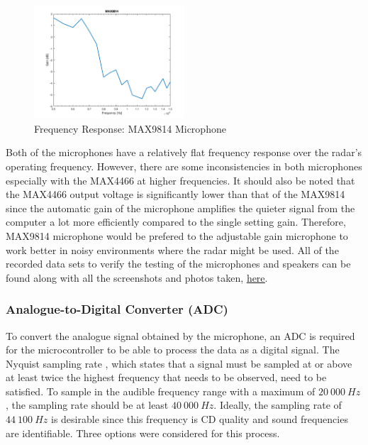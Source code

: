 \begin{figure}[h!]
    \centering
    \includegraphics[width = 0.5\textwidth]{images/MAX9814.pdf}
    \caption{Frequency Response: MAX9814 Microphone}\label{fig:MAX9814}
\end{figure}

Both of the microphones have a relatively flat frequency response over the radar's operating frequency. However, there are some inconsistencies in both microphones especially with the MAX4466 at higher frequencies. It should also be noted that the MAX4466 output voltage is significantly lower than that of the MAX9814 since the automatic gain of the microphone amplifies the quieter signal from the computer a lot more efficiently compared to the single setting gain. Therefore, MAX9814 microphone would be prefered to the adjustable gain microphone to work better in noisy environments where the radar might be used. All of the recorded data sets to verify the testing of the microphones and speakers can be found along with all the screenshots and photos taken, \href{https://github.com/DewanPieterse/AudioRadar/tree/master/Matlab}{\underline{here}}. 


\subsubsection{Analogue-to-Digital Converter (ADC)}
To convert the analogue signal obtained by the microphone, an ADC is required for the microcontroller to be able to process the data as a digital signal. The Nyquist sampling rate \cite{landau_sampling_1967}, which states that a signal must be sampled at or above at least twice the highest frequency that needs to be observed, need to be satisfied. To sample in the audible frequency range with a maximum of $20\ 000\ Hz$, the sampling rate should be at least $40\ 000\ Hz$. Ideally, the sampling rate of $44\ 100\ Hz$ is desirable since this frequency is CD quality and sound frequencies are identifiable. Three options were considered for this process. 

